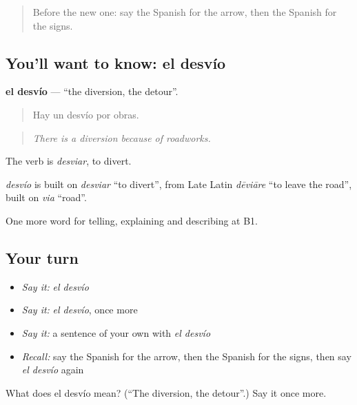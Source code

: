 \label{lesson:ES-C672-desvio}



\begin{quote}
Before the new one: say the Spanish for the arrow, then the Spanish for the signs.
\end{quote}

\subsection*{You'll want to know: el desvío}
\textbf{el desvío} — \textquotedblleft{}the diversion, the detour\textquotedblright{}.

\begin{quote}
Hay un desvío por obras.
\end{quote}

\begin{quote}
\emph{There is a diversion because of roadworks.}
\end{quote}

The verb is \emph{desviar}, to divert.

\begin{cousinweb}
\emph{desvío} is built on \emph{desviar} \textquotedblleft{}to divert\textquotedblright{}, from Late Latin \emph{dēviāre} \textquotedblleft{}to leave the road\textquotedblright{}, built on \emph{via} \textquotedblleft{}road\textquotedblright{}.
\end{cousinweb}

\begin{grammarlens}[title={What you've built}]
One more word for telling, explaining and describing at B1.
\end{grammarlens}

\subsection*{Your turn}
\begin{itemize}
\raggedright
  \item \emph{Say it:} \emph{el desvío}
  \item \emph{Say it:} \emph{el desvío}, once more
  \item \emph{Say it:} a sentence of your own with \emph{el desvío}
  \item \emph{Recall:} say the Spanish for the arrow, then the Spanish for the signs, then say \emph{el desvío} again
\end{itemize}

\begin{tcolorbox}[breakable,colback=teal!4,colframe=teal!35!black,title={Before you move on}]
What does el desvío mean? (\textquotedblleft{}The diversion, the detour\textquotedblright{}.) Say it once more.
\end{tcolorbox}
